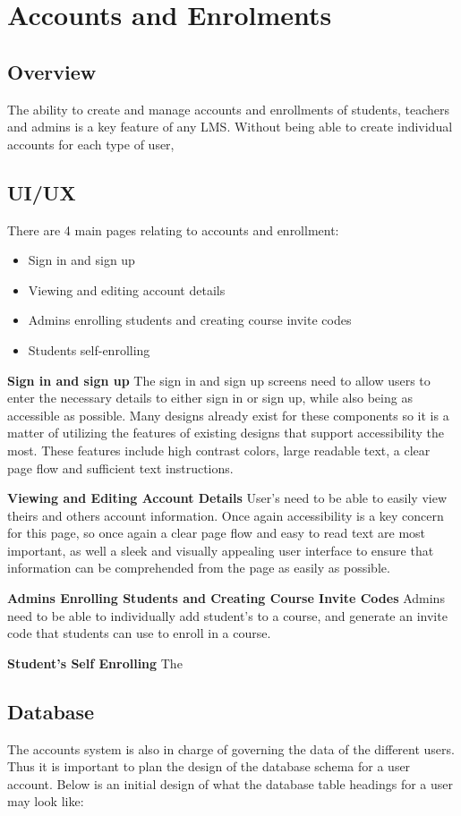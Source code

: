 \section{Accounts and Enrolments}
\subsection{Overview}
The ability to create and manage accounts and enrollments of students, teachers and admins is a key feature of any LMS. Without being able to create individual accounts for each type of user, 

\subsection{UI/UX}
There are 4 main pages relating to accounts and enrollment:
\begin{itemize}
  \item Sign in and sign up
  \item Viewing and editing account details
  \item Admins enrolling students and creating course invite codes
  \item Students self-enrolling
\end{itemize}

\textbf{Sign in and sign up}
The sign in and sign up screens need to allow users to enter the necessary details to either sign in or sign up, while also being as accessible as possible. Many designs already exist for these components so it is a matter of utilizing the features of existing designs that support accessibility the most. These features include high contrast colors, large readable text, a clear page flow and sufficient text instructions.

\textbf{Viewing and Editing Account Details}
User's need to be able to easily view theirs and others account information. Once again accessibility is a key concern for this page, so once again a clear page flow and easy to read text are most important, as well a sleek and visually appealing user interface to ensure that information can be comprehended from the page as easily as possible.

\textbf{Admins Enrolling Students and Creating Course Invite Codes}
Admins need to be able to individually add student's to a course, and generate an invite code that students can use to enroll in a course. 

\textbf{Student's Self Enrolling}
The 


\subsection{Database}
The accounts system is also in charge of governing the data of the different users. Thus it is important to plan the design of the database schema for a user account. Below is an initial design of what the database table headings for a user may look like:

